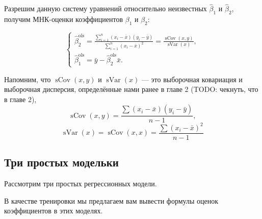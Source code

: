 \documentclass[12pt]{article}
\DeclareMathOperator{\sCov}{sCov}
\DeclareMathOperator{\sVar}{sVar}
\newcommand{\hb}{\hat{\beta}}
\newcommand{\ols}{\text{ols}}
\begin{document}
Разрешим данную систему уравнений относительно неизвестных $\hb_1$ и $\hb_2$, получим МНК-оценки коэффициентов $\beta_1$ и $\beta_2$:

\begin{equation*}
 \begin{cases}
\hb_2^{\ols} = \frac{\sum_{i=1}^n(x_i - \bar{x})(y_i - \bar{y})}{\sum_{i=1}^n(x_i-\bar{x})^2} = \frac{\sCov(x,y)}{\sVar(x)},
\\
\hb_1^{\ols} = \bar{y} - \hb_2^{\ols}\bar{x}.
 \end{cases}
\end{equation*}

Напомним, что $\sCov(x, y)$ и $\sVar(x)$ — это выборочная ковариация и выборочная дисперсия, определённые нами ранее в главе 2 (TODO: чекнуть, что в главе 2),
\[
\sCov(x, y) = \frac{\sum (x_i - \bar x)(y_i - \bar y)}{n - 1}, 
\]
\[
\sVar(x) = \sCov(x, x) = \frac{\sum (x_i - \bar x)^2}{n - 1}
\]


\subsection{Три простых модельки}
Рассмотрим три простых регрессионных модели. 

В качестве тренировки мы предлагаем вам
вывести формулы оценок коэффициентов в этих моделях.
\end{document}
